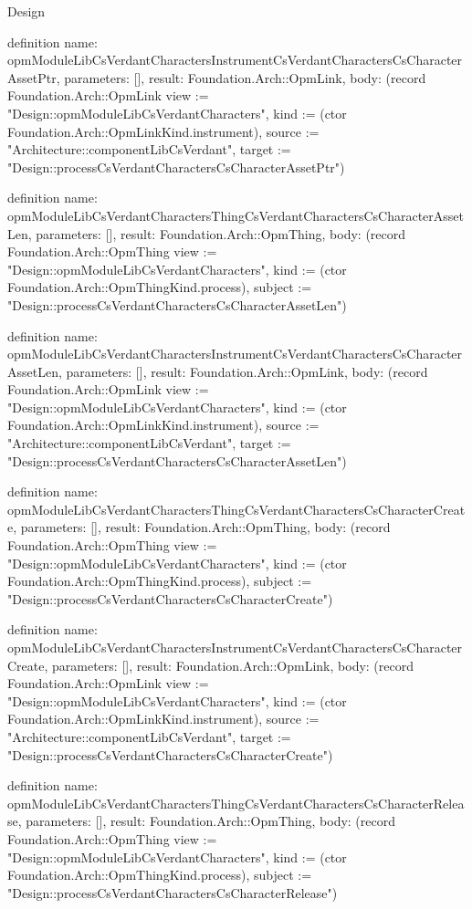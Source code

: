 \begin{lexlean}{Design}
\begin{semanticmodule}
definition{
  name: opmModuleLibCsVerdantCharactersInstrumentCsVerdantCharactersCsCharacterAssetPtr,
  parameters: [],
  result: Foundation.Arch::OpmLink,
  body: (record Foundation.Arch::OpmLink {view := "Design::opmModuleLibCsVerdantCharacters", kind := (ctor Foundation.Arch::OpmLinkKind.instrument), source := "Architecture::componentLibCsVerdant", target := "Design::processCsVerdantCharactersCsCharacterAssetPtr"})
}

definition{
  name: opmModuleLibCsVerdantCharactersThingCsVerdantCharactersCsCharacterAssetLen,
  parameters: [],
  result: Foundation.Arch::OpmThing,
  body: (record Foundation.Arch::OpmThing {view := "Design::opmModuleLibCsVerdantCharacters", kind := (ctor Foundation.Arch::OpmThingKind.process), subject := "Design::processCsVerdantCharactersCsCharacterAssetLen"})
}

definition{
  name: opmModuleLibCsVerdantCharactersInstrumentCsVerdantCharactersCsCharacterAssetLen,
  parameters: [],
  result: Foundation.Arch::OpmLink,
  body: (record Foundation.Arch::OpmLink {view := "Design::opmModuleLibCsVerdantCharacters", kind := (ctor Foundation.Arch::OpmLinkKind.instrument), source := "Architecture::componentLibCsVerdant", target := "Design::processCsVerdantCharactersCsCharacterAssetLen"})
}

definition{
  name: opmModuleLibCsVerdantCharactersThingCsVerdantCharactersCsCharacterCreate,
  parameters: [],
  result: Foundation.Arch::OpmThing,
  body: (record Foundation.Arch::OpmThing {view := "Design::opmModuleLibCsVerdantCharacters", kind := (ctor Foundation.Arch::OpmThingKind.process), subject := "Design::processCsVerdantCharactersCsCharacterCreate"})
}

definition{
  name: opmModuleLibCsVerdantCharactersInstrumentCsVerdantCharactersCsCharacterCreate,
  parameters: [],
  result: Foundation.Arch::OpmLink,
  body: (record Foundation.Arch::OpmLink {view := "Design::opmModuleLibCsVerdantCharacters", kind := (ctor Foundation.Arch::OpmLinkKind.instrument), source := "Architecture::componentLibCsVerdant", target := "Design::processCsVerdantCharactersCsCharacterCreate"})
}

definition{
  name: opmModuleLibCsVerdantCharactersThingCsVerdantCharactersCsCharacterRelease,
  parameters: [],
  result: Foundation.Arch::OpmThing,
  body: (record Foundation.Arch::OpmThing {view := "Design::opmModuleLibCsVerdantCharacters", kind := (ctor Foundation.Arch::OpmThingKind.process), subject := "Design::processCsVerdantCharactersCsCharacterRelease"})
}


\end{semanticmodule}
\end{lexlean}
